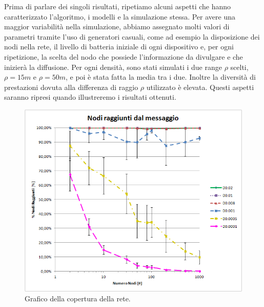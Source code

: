 Prima di parlare dei singoli risultati, ripetiamo alcuni aspetti che hanno caratterizzato l'algoritmo, i modelli e la simulazione stessa. Per avere una maggior variabilità nella simulazione, abbiamo assegnato molti valori di parametri tramite l'uso di generatori casuali, come ad esempio la disposizione dei nodi nella rete, il livello di batteria iniziale di ogni dispositivo e, per ogni ripetizione, la scelta del nodo che possiede l'informazione da divulgare e che inizierà la diffusione. Per ogni densità, sono stati simulati i due range $\rho$ scelti, $\rho=15m$ e $\rho=50m$, e poi è stata fatta la media tra i due. Inoltre la diversità di prestazioni dovuta alla differenza di raggio $\rho$ utilizzato è elevata. Questi aspetti saranno ripresi quando illustreremo i risultati ottenuti.

\begin{figure}[t]
	\centering
	\includegraphics[width=0.9\linewidth]{Images/risultati/copertura}
	\caption[Copertura di rete]{Grafico della copertura della rete.}
	\label{fig:copertura}
\end{figure}
